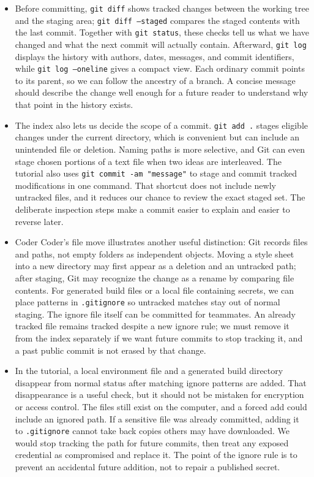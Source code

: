 \documentclass[10pt]{article}
\begin{document}
\begin{itemize}[leftmargin=1.25em, itemsep=0.3em, parsep=0pt, topsep=0pt]
    \item Before committing, \texttt{git diff} shows tracked changes between the working tree and the staging area; \texttt{git diff --staged} compares the staged contents with the last commit. Together with \texttt{git status}, these checks tell us what we have changed and what the next commit will actually contain. Afterward, \texttt{git log} displays the history with authors, dates, messages, and commit identifiers, while \texttt{git log --oneline} gives a compact view. Each ordinary commit points to its parent, so we can follow the ancestry of a branch. A concise message should describe the change well enough for a future reader to understand why that point in the history exists.

    \item The index also lets us decide the scope of a commit. \texttt{git add .} stages eligible changes under the current directory, which is convenient but can include an unintended file or deletion. Naming paths is more selective, and Git can even stage chosen portions of a text file when two ideas are interleaved. The tutorial also uses \texttt{git commit -am "message"} to stage and commit tracked modifications in one command. That shortcut does not include newly untracked files, and it reduces our chance to review the exact staged set. The deliberate inspection steps make a commit easier to explain and easier to reverse later.

    \item Coder Coder's file move illustrates another useful distinction: Git records files and paths, not empty folders as independent objects. Moving a style sheet into a new directory may first appear as a deletion and an untracked path; after staging, Git may recognize the change as a rename by comparing file contents. For generated build files or a local file containing secrets, we can place patterns in \texttt{.gitignore} so untracked matches stay out of normal staging. The ignore file itself can be committed for teammates. An already tracked file remains tracked despite a new ignore rule; we must remove it from the index separately if we want future commits to stop tracking it, and a past public commit is not erased by that change.

    \item In the tutorial, a local environment file and a generated build directory disappear from normal status after matching ignore patterns are added. That disappearance is a useful check, but it should not be mistaken for encryption or access control. The files still exist on the computer, and a forced add could include an ignored path. If a sensitive file was already committed, adding it to \texttt{.gitignore} cannot take back copies others may have downloaded. We would stop tracking the path for future commits, then treat any exposed credential as compromised and replace it. The point of the ignore rule is to prevent an accidental future addition, not to repair a published secret.
\end{itemize}
\end{document}
